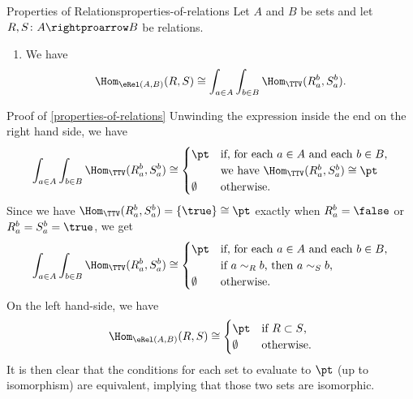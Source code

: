 \begin{proposition}{Properties of Relations}{properties-of-relations}%
    Let $A$ and $B$ be sets and let $R,S\colon A\rightproarrow B$ be relations.
    \begin{enumerate}
        \item\label{properties-of-relations-end-formula-for-the-set-of-inclusions-of-relations}We have
            \[
                \Hom_{\eRel(A,B)}(R,S)%
                \cong%
                \int_{a\in A}\int_{b\in B}\Hom_{\TTV}(R^{b}_{a},S^{b}_{a}).%
            \]%
    \end{enumerate}
\end{proposition}
\begin{Proof}{Proof of \cref{properties-of-relations}}%
    Unwinding the expression inside the end on the right hand side, we have
    \[
        \int_{a\in A}\int_{b\in B}\Hom_{\TTV}(R^{b}_{a},S^{b}_{a})%
        \cong%
        \begin{cases}%
            \pt       &\text{if, for each $a\in A$ and each $b\in B$,}\\%
                      &\text{we have $\Hom_{\TTV}(R^{b}_{a},S^{b}_{a})\cong\pt$}\\%
            \emptyset &\text{otherwise.}%
        \end{cases}%
    \]%
    Since we have $\Hom_{\TTV}(R^{b}_{a},S^{b}_{a})=\{\true\}\cong\pt$ exactly when $R^{b}_{a}=\false$ or $R^{b}_{a}=S^{b}_{a}=\true$, we get
    \[
        \int_{a\in A}\int_{b\in B}\Hom_{\TTV}(R^{b}_{a},S^{b}_{a})%
        \cong%
        \begin{cases}%
            \pt       &\text{if, for each $a\in A$ and each $b\in B$,}\\%
                      &\text{if $a\sim_{R}b$, then $a\sim_{S}b$,}\\%
            \emptyset &\text{otherwise.}%
        \end{cases}%
    \]%
    On the left hand-side, we have
    \[
        \Hom_{\eRel(A,B)}(R,S)%
        \cong%
        \begin{cases}%
            \pt       &\text{if $R\subset S$,}\\%
            \emptyset &\text{otherwise.}%
        \end{cases}%
    \]%
    It is then clear that the conditions for each set to evaluate to $\pt$ (up to isomorphism) are equivalent, implying that those two sets are isomorphic.
\end{Proof}
